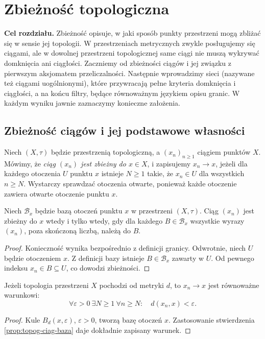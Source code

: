 \chapter{Zbieżność topologiczna}
\label{ch:topog-zbieznosc}

\noindent\textbf{Cel rozdziału.}
Zbieżność opisuje, w jaki sposób punkty przestrzeni mogą zbliżać się
w sensie jej topologii. W przestrzeniach metrycznych zwykle posługujemy
się ciągami, ale w dowolnej przestrzeni topologicznej same ciągi
nie muszą wykrywać domknięcia ani ciągłości. Zaczniemy od zbieżności
ciągów i jej związku z pierwszym aksjomatem przeliczalności.
Następnie wprowadzimy
sieci (nazywane też ciągami uogólnionymi), które przywracają
pełne kryteria domknięcia i ciągłości, a na końcu filtry,
będące równoważnym językiem opisu granic.
W każdym wyniku jawnie zaznaczymy konieczne założenia.

\section{Zbieżność ciągów i jej podstawowe własności}
\label{sec:topog-zbieznosc-ciagi}

\begin{definicja}
\label{def:topog-granica-ciagu}
Niech $(X,\tau)$ będzie przestrzenią topologiczną, a
$(x_n)_{n\ge1}$ ciągiem punktów $X$. Mówimy, że
\emph{ciąg $(x_n)$ jest zbieżny do $x\in X$}, i zapisujemy
$x_n\to x$, jeżeli dla każdego otoczenia $U$ punktu $x$
istnieje $N\ge1$ takie, że $x_n\in U$ dla wszystkich $n\ge N$.
Wystarczy sprawdzać otoczenia otwarte, ponieważ każde otoczenie
zawiera otwarte otoczenie punktu $x$.
\end{definicja}

\begin{stwierdzenie}
\label{prop:topog-ciag-baza}
Niech $\mathcal B_x$ będzie bazą otoczeń punktu $x$ w przestrzeni
$(X,\tau)$. Ciąg $(x_n)$ jest zbieżny do $x$ wtedy i tylko wtedy,
gdy dla każdego $B\in\mathcal B_x$ wszystkie wyrazy $(x_n)$,
poza skończoną liczbą, należą do $B$.
\end{stwierdzenie}
\begin{proof}
Konieczność wynika bezpośrednio z definicji granicy. Odwrotnie,
niech $U$ będzie otoczeniem $x$. Z definicji bazy istnieje
$B\in\mathcal B_x$ zawarty w $U$. Od pewnego indeksu
$x_n\in B\subseteq U$, co dowodzi zbieżności.
\end{proof}

\begin{stwierdzenie}
\label{prop:topog-ciag-metryka}
Jeżeli topologia przestrzeni $X$ pochodzi od metryki $d$,
to $x_n\to x$ jest równoważne warunkowi:
\[
\forall\varepsilon>0\ \exists N\ge1\ \forall n\ge N:
\quad d(x_n,x)<\varepsilon.
\]
\end{stwierdzenie}
\begin{proof}
Kule $B_d(x,\varepsilon)$, $\varepsilon>0$, tworzą bazę otoczeń
$x$. Zastosowanie stwierdzenia \ref{prop:topog-ciag-baza}
daje dokładnie zapisany warunek.
\end{proof}

